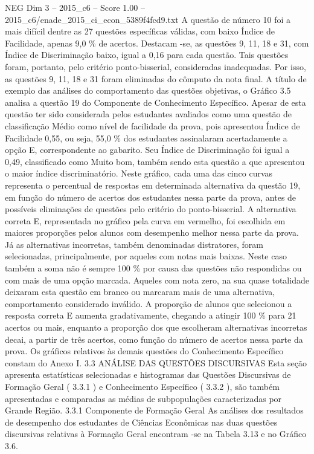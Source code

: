 \begin{textsample}{NEG Dim 3 – 2015\_c6 – Score 1.00 – 2015\_c6/enade\_2015\_ci\_econ\_5389f4fcd9.txt}
A questão de número 10 foi a mais difícil dentre as 27 questões específicas válidas, com baixo Índice de Facilidade, apenas 9,0 \% de acertos.
Destacam -se, as questões 9, 11, 18 e 31, com Índice de Discriminação baixo, igual a 0,16 para cada questão.
Tais questões foram, portanto, pelo critério ponto-bisserial, consideradas inadequadas.
Por isso, as questões 9, 11, 18 e 31 foram eliminadas do cômputo da nota final.
A título de exemplo das análises do comportamento das questões objetivas, o Gráfico 3.5 analisa a questão 19 do Componente de Conhecimento Específico.
Apesar de esta questão ter sido considerada pelos estudantes avaliados como uma questão de classificação Médio como nível de facilidade da prova, pois apresentou Índice de Facilidade 0,55, ou seja, 55,0 \% dos estudantes assinalaram acertadamente a opção E, correspondente ao gabarito.
Seu Índice de Discriminação foi igual a 0,49, classificado como Muito bom, também sendo esta questão a que apresentou o maior índice discriminatório.
Neste gráfico, cada uma das cinco curvas representa o percentual de respostas em determinada alternativa da questão 19, em função do número de acertos dos estudantes nessa parte da prova, antes de possíveis eliminações de questões pelo critério do ponto-bisserial.
A alternativa correta E, representada no gráfico pela curva em vermelho, foi escolhida em maiores proporções pelos alunos com desempenho melhor nessa parte da prova.
Já as alternativas incorretas, também denominadas distratores, foram selecionadas, principalmente, por aqueles com notas mais baixas.
Neste caso também a soma não é sempre 100 \% por causa das questões não respondidas ou com mais de uma opção marcada.
Aqueles com nota zero, na sua quase totalidade deixaram esta questão em branco ou marcaram mais de uma alternativa, comportamento considerado inválido.
A proporção de alunos que selecionou a resposta correta E aumenta gradativamente, chegando a atingir 100 \% para 21 acertos ou mais, enquanto a proporção dos que escolheram alternativas incorretas decai, a partir de três acertos, como função do número de acertos nessa parte da prova.
Os gráficos relativos às demais questões do Conhecimento Específico constam do Anexo I. 3.3 ANÁLISE DAS QUESTÕES DISCURSIVAS Esta seção apresenta estatísticas selecionadas e histogramas das Questões Discursivas de Formação Geral ( 3.3.1 ) e Conhecimento Específico ( 3.3.2 ), são também apresentadas e comparadas as médias de subpopulações caracterizadas por Grande Região. 3.3.1 Componente de Formação Geral As análises dos resultados de desempenho dos estudantes de Ciências Econômicas nas duas questões discursivas relativas à Formação Geral encontram -se na Tabela 3.13 e no Gráfico 3.6.

\end{textsample}
